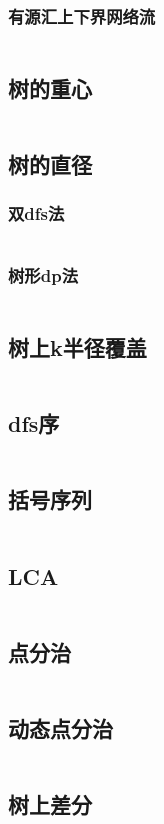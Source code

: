 \documentclass[a4paper,11pt]{article}
\begin{document}
\subsubsection{有源汇上下界网络流}
\inputminted[breaklines]{c++}{图论/有源汇上下界网络流.cpp} 
\subsection{树的重心}
\inputminted[breaklines]{c++}{图论/树的重心.cpp}
\subsection{树的直径}
\subsubsection{双dfs法}
\inputminted[breaklines]{c++}{图论/树的直径双dfs.cpp}
\subsubsection{树形dp法}
\inputminted[breaklines]{c++}{图论/树的直径树dp.cpp}
\subsection{树上k半径覆盖}
\inputminted[breaklines]{c++}{图论/树上k半径覆盖.cpp}
\subsection{dfs序}
\inputminted[breaklines]{c++}{图论/括号序列.cpp}
\subsection{括号序列}
\inputminted[breaklines]{c++}{图论/括号序列.cpp}
\subsection{LCA}
\inputminted[breaklines]{c++}{图论/LCA.cpp} 
\subsection{点分治}
\inputminted[breaklines]{c++}{图论/点分治.cpp}
\subsection{动态点分治}
\inputminted[breaklines]{c++}{图论/动态点分治.cpp}
\subsection{树上差分}
\inputminted[breaklines]{c++}{图论/树上差分.cpp}
\end{document}
